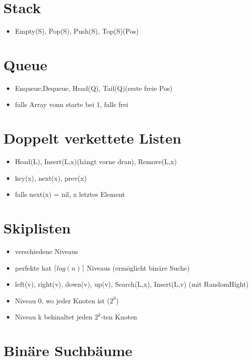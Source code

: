 \documentclass{article}
\begin{document}
\section{Stack}
\begin{itemize}
\item Empty(S), Pop(S), Push(S), Top(S)(Pos)
\end{itemize}

\section{Queue}
\begin{itemize}
\item Enqueue,Dequeue, Head(Q), Tail(Q)(erste freie Pos)
\item falls Array vonn starte bei 1, falls frei
\end{itemize}

\section{Doppelt verkettete Listen}
\begin{itemize}
\item Head(L), Insert(L,x)(h{\"a}ngt vorne dran), Remove(L,x)
\item key(x), next(x), prev(x)
\item falls next(x) = nil, x letztes Element
\end{itemize}

\section{Skiplisten}
\begin{itemize}
\item verschiedene Niveaus 
\item perfekte hat $ \lceil  log(n)\rceil$ Niveaus (erm{\"o}glicht bin{\"a}re Suche)
\item left(v), right(v), down(v), up(v), Search(L,x), Insert(L,v) (mit RandomHight)
\item Niveau 0, wo jeder Knoten ist ($2^0$)
\item Niveau k behinaltet jeden $2^k$-ten Knoten
\end{itemize}

\section{Bin{\"a}re Suchb{\"a}ume}
\end{document}
